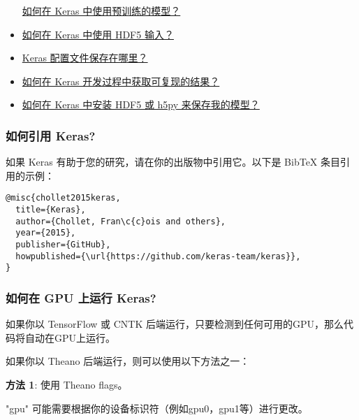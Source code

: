 \begin{itemize}
    \hyperref[how-can-i-use-pre-trained-models-in-keras]{如何在 Keras 中使用预训练的模型？}
\item
    \hyperref[how-can-i-use-hdf5-inputs-with-keras]{如何在 Keras 中使用 HDF5 输入？}
\item
    \hyperref[where-is-the-keras-configuration-file-stored]{Keras 配置文件保存在哪里？}
\item
    \hyperref[how-can-i-obtain-reproducible-results-using-keras-during-development]{如何在 Keras 开发过程中获取可复现的结果？}
\item
    \hyperref[how-can-i-install-HDF5-or-h5py-to-save-my-models-in-Keras]{如何在 Keras 中安装 HDF5 或 h5py 来保存我的模型？}
\end{itemize}



\subsubsection{如何引用 Keras?}\label{how-should-i-cite-keras}

如果 Keras 有助于您的研究，请在你的出版物中引用它。以下是 BibTeX
条目引用的示例：

\begin{verbatim}
@misc{chollet2015keras,
  title={Keras},
  author={Chollet, Fran\c{c}ois and others},
  year={2015},
  publisher={GitHub},
  howpublished={\url{https://github.com/keras-team/keras}},
}
\end{verbatim}



\subsubsection{如何在 GPU 上运行
Keras?}\label{how-can-i-run-keras-on-gpu}

如果你以 TensorFlow 或 CNTK
后端运行，只要检测到任何可用的GPU，那么代码将自动在GPU上运行。

如果你以 Theano 后端运行，则可以使用以下方法之一：

\textbf{方法 1}: 使用 Theano flags。

\begin{Shaded}
\begin{Highlighting}[]
\end{Highlighting}
\end{Shaded}

"gpu" 可能需要根据你的设备标识符（例如gpu0，gpu1等）进行更改。

